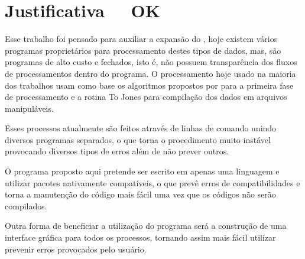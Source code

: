 \chapter{Justificativa \,\,\,\,\, OK}
\label{cap-justificativa}

    Esse trabalho foi pensado para auxiliar a expansão do \MT, hoje existem vários programas proprietários para processamento destes tipos de dados, mas, são programas de alto custo e fechados, isto é, não possuem transparência dos fluxos de processamentos dentro do programa. O processamento hoje usado na maioria dos trabalhos usam como base os algoritmos propostos por \citeauthor{egbert97} para a primeira fase de processamento e a rotina To Jones \cite{egbert97} para compilação dos dados em arquivos manipuláveis.
    
    Esses processos atualmente são feitos através de linhas de comando unindo diversos programas separados, o que torna o procedimento muito instável provocando diversos tipos de erros além de não prever outros. %
    
    O programa proposto aqui pretende ser escrito em apenas uma linguagem e utilizar pacotes nativamente compatíveis, o que prevê erros de compatibilidades e torna a manutenção do código mais fácil uma vez que os códigos não serão compilados.
    
    Outra forma de beneficiar a utilização do programa será a construção de uma interface gráfica para todos os processos, tornando assim mais fácil utilizar prevenir erros provocados pelo usuário.    
    
    
